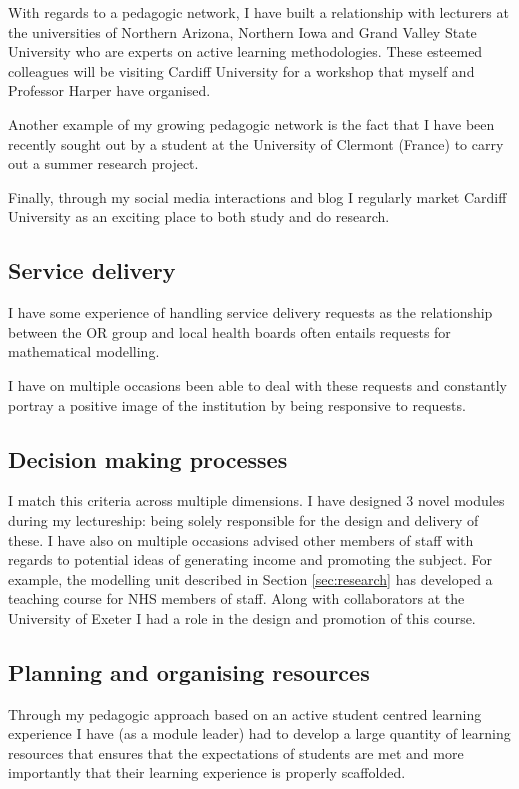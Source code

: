 \documentclass{article}
\begin{document}
With regards to a pedagogic network, I have built a relationship with lecturers at the universities of Northern Arizona, Northern Iowa and Grand Valley State University who are experts on active learning methodologies.
These esteemed colleagues will be visiting Cardiff University for a workshop that myself and Professor Harper have organised.

Another example of my growing pedagogic network is the fact that I have been recently sought out by a student at the University of Clermont (France) to carry out a summer research project.

Finally, through my social media interactions and blog I regularly market Cardiff University as an exciting place to both study and do research.

\subsection{Service delivery}

I have some experience of handling service delivery requests as the relationship between the OR group and local health boards often entails requests for mathematical modelling.

I have on multiple occasions been able to deal with these requests and constantly portray a positive image of the institution by being responsive to requests.

\subsection{Decision making processes}

I match this criteria across multiple dimensions.
I have designed 3 novel modules during my lectureship: being solely responsible for the design and delivery of these.
I have also on multiple occasions advised other members of staff with regards to potential ideas of generating income and promoting the subject. For example, the modelling unit described in Section \ref{sec:research} has developed a teaching course for NHS members of staff.
Along with collaborators at the University of Exeter I had a role in the design and promotion of this course.

\subsection{Planning and organising resources}

Through my pedagogic approach based on an active student centred learning experience I have (as a module leader) had to develop a large quantity of learning resources that ensures that the expectations of students are met and more importantly that their learning experience is properly scaffolded.
\end{document}
